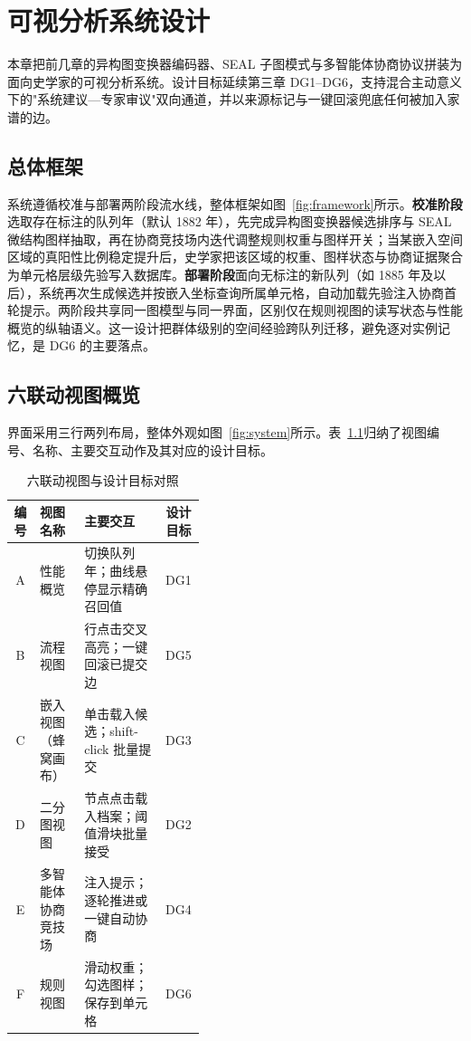 \chapter{可视分析系统设计}\label{chap:vis}

本章把前几章的异构图变换器编码器、SEAL 子图模式与多智能体协商协议拼装为面向史学家的可视分析系统。设计目标延续第三章 DG1--DG6，支持混合主动\citep{green2009mixedinitiative}意义下的"系统建议---专家审议"双向通道，并以来源标记与一键回滚兜底任何被加入家谱的边\citep{sacha2014knowledge}。

\section{总体框架}\label{sec:vis-overall}

系统遵循校准与部署两阶段流水线，整体框架如图~\ref{fig:framework}所示。\textbf{校准阶段}选取存在标注的队列年（默认 1882 年），先完成异构图变换器候选排序与 SEAL 微结构图样抽取，再在协商竞技场内迭代调整规则权重与图样开关；当某嵌入空间区域的真阳性比例稳定提升后，史学家把该区域的权重、图样状态与协商证据聚合为单元格层级先验写入数据库。\textbf{部署阶段}面向无标注的新队列（如 1885 年及以后），系统再次生成候选并按嵌入坐标查询所属单元格，自动加载先验注入协商首轮提示。两阶段共享同一图模型与同一界面，区别仅在规则视图的读写状态与性能概览的纵轴语义。这一设计把群体级别的空间经验跨队列迁移，避免逐对实例记忆，是 DG6 的主要落点。

\section{六联动视图概览}\label{sec:vis-views}

界面采用三行两列布局，整体外观如图~\ref{fig:system}所示。表~\ref{tab:six-views}归纳了视图编号、名称、主要交互动作及其对应的设计目标。

\begin{table}[!htbp]
    \centering
    \small
    \caption{六联动视图与设计目标对照}\label{tab:six-views}
    \begin{tabular}{c l p{0.42\linewidth} c}
        \toprule
        编号 & 视图名称 & 主要交互 & 设计目标 \\
        \midrule
        A & 性能概览 & 切换队列年；曲线悬停显示精确召回值 & DG1 \\
        B & 流程视图 & 行点击交叉高亮；一键回滚已提交边 & DG5 \\
        C & 嵌入视图（蜂窝画布） & 单击载入候选；shift-click 批量提交 & DG3 \\
        D & 二分图视图 & 节点点击载入档案；阈值滑块批量接受 & DG2 \\
        E & 多智能体协商竞技场 & 注入提示；逐轮推进或一键自动协商 & DG4 \\
        F & 规则视图 & 滑动权重；勾选图样；保存到单元格 & DG6 \\
        \bottomrule
    \end{tabular}
\end{table}

